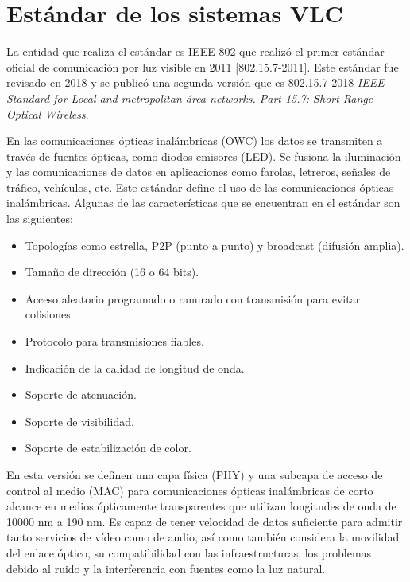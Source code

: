 
\label{chp:Utiliz}
\minitoc

\section{Estándar de los sistemas VLC}
La entidad que realiza el estándar es IEEE 802 que realizó el primer estándar oficial de
comunicación por luz visible en 2011 [802.15.7-2011]. Este estándar fue revisado en
2018 y se publicó una segunda versión que es 802.15.7-2018 \textit{IEEE Standard for Local
and metropolitan área networks. Part 15.7: Short-Range Optical Wireless}.

En las comunicaciones ópticas inalámbricas (OWC) los datos se transmiten a través de 
fuentes ópticas, como diodos emisores (LED). Se fusiona la iluminación y las 
comunicaciones de datos en aplicaciones como farolas, letreros, señales de tráfico, 
vehículos, etc. Este estándar define el uso de las comunicaciones ópticas inalámbricas.
Algunas de las características que se encuentran en el estándar son las siguientes: \cite{ieee}
\begin{itemize}
    \item Topologías como estrella, P2P (punto a punto) y broadcast (difusión amplia).
    \item Tamaño de dirección (16 o 64 bits).
    \item Acceso aleatorio programado o ranurado con transmisión para evitar colisiones.
    \item Protocolo para transmisiones fiables.
    \item Indicación de la calidad de longitud de onda.
    \item Soporte de atenuación.
    \item Soporte de visibilidad.
    \item Soporte de estabilización de color.
\end{itemize}

En esta versión se definen una capa física (PHY) y una subcapa de acceso de control 
al medio (MAC) para comunicaciones ópticas inalámbricas de corto alcance en medios 
ópticamente transparentes que utilizan longitudes de onda de 10000 nm a 190 nm. Es 
capaz de tener velocidad de datos suficiente para admitir tanto servicios de vídeo como 
de audio, así como también considera la movilidad del enlace óptico, su compatibilidad 
con las infraestructuras, los problemas debido al ruido y la interferencia con fuentes 
como la luz natural. \cite{ieee}

